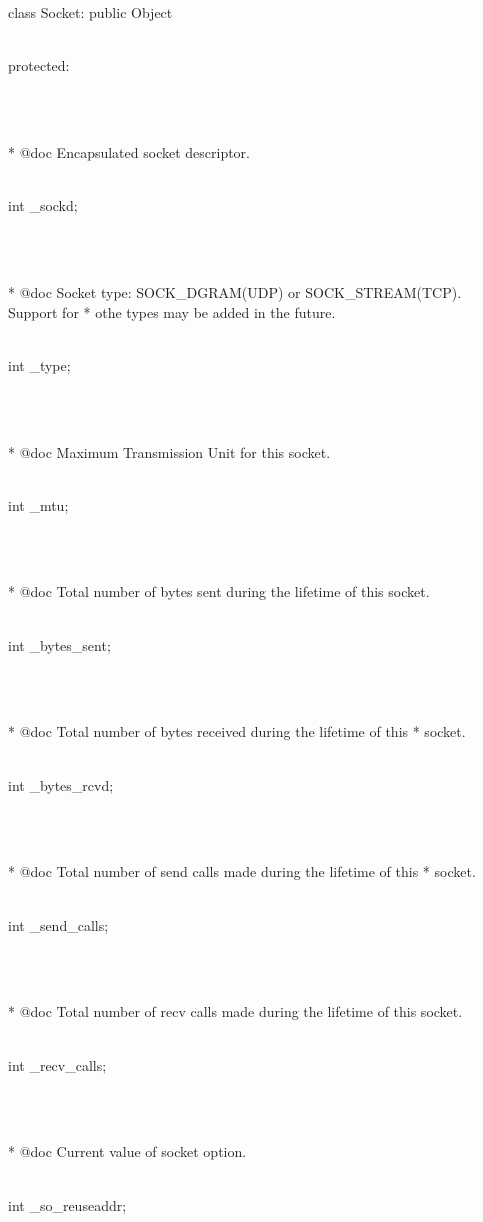 \documentclass{article}
\begin{document}
 class Socket: public Object {
\\
 protected:
\strut\\\strut\\* @doc Encapsulated socket descriptor.  \strut\goodbreak
{}\strut\nopagebreak\\
     int _sockd;
\strut\\\strut\\* @doc Socket type: SOCK_DGRAM(UDP) or SOCK_STREAM(TCP). Support for
	  * othe types may be added in the future.
	  \strut\goodbreak
{}\strut\nopagebreak\\
         int _type;
\strut\\\strut\\* @doc Maximum Transmission Unit for this socket.  \strut\goodbreak
{}\strut\nopagebreak\\
         int _mtu;
\strut\\\strut\\* @doc Total number of bytes sent during the lifetime of this socket.  \strut\goodbreak
{}\strut\nopagebreak\\
         int _bytes_sent;
\strut\\\strut\\* @doc Total number of bytes received during the lifetime of this 
	  * socket.  
	  \strut\goodbreak
{}\strut\nopagebreak\\
     int _bytes_rcvd;
\strut\\\strut\\* @doc Total number of send calls made during the lifetime of this 
	  * socket.
      \strut\goodbreak
{}\strut\nopagebreak\\
     int _send_calls;
\strut\\\strut\\* @doc Total number of recv calls made during the lifetime of this socket.
      \strut\goodbreak
{}\strut\nopagebreak\\
     int _recv_calls;
\strut\\\strut\\* @doc Current value of socket option.  \strut\goodbreak
{}\strut\nopagebreak\\
         int _so_reuseaddr;
}
\end{document}
